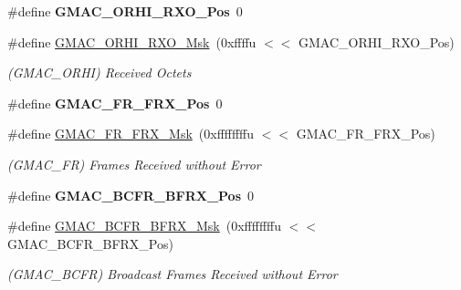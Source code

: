 \begin{DoxyCompactItemize}
\mbox{\label{group__SAME70__GMAC_gae9e8bcf4f97ba8f01c881b256d9f4924}} 
\#define {\bfseries G\+M\+A\+C\+\_\+\+O\+R\+H\+I\+\_\+\+R\+X\+O\+\_\+\+Pos}~0
\item 
\mbox{\label{group__SAME70__GMAC_gaf95253884b3483ac7db5ddb45e6a73f4}} 
\#define \mbox{\hyperlink{group__SAME70__GMAC_gaf95253884b3483ac7db5ddb45e6a73f4}{G\+M\+A\+C\+\_\+\+O\+R\+H\+I\+\_\+\+R\+X\+O\+\_\+\+Msk}}~(0xffffu $<$$<$ G\+M\+A\+C\+\_\+\+O\+R\+H\+I\+\_\+\+R\+X\+O\+\_\+\+Pos)
\begin{DoxyCompactList}\small\item\em (G\+M\+A\+C\+\_\+\+O\+R\+HI) Received Octets \end{DoxyCompactList}\item 
\mbox{\label{group__SAME70__GMAC_gab59eb0b2a4ca2b0089d0039b58b0745a}} 
\#define {\bfseries G\+M\+A\+C\+\_\+\+F\+R\+\_\+\+F\+R\+X\+\_\+\+Pos}~0
\item 
\mbox{\label{group__SAME70__GMAC_gaa5e2bd4754982997653c19876af89ca2}} 
\#define \mbox{\hyperlink{group__SAME70__GMAC_gaa5e2bd4754982997653c19876af89ca2}{G\+M\+A\+C\+\_\+\+F\+R\+\_\+\+F\+R\+X\+\_\+\+Msk}}~(0xffffffffu $<$$<$ G\+M\+A\+C\+\_\+\+F\+R\+\_\+\+F\+R\+X\+\_\+\+Pos)
\begin{DoxyCompactList}\small\item\em (G\+M\+A\+C\+\_\+\+FR) Frames Received without Error \end{DoxyCompactList}\item 
\mbox{\label{group__SAME70__GMAC_gaf7a9143b9ab4a7adce04bfef76d5b0a3}} 
\#define {\bfseries G\+M\+A\+C\+\_\+\+B\+C\+F\+R\+\_\+\+B\+F\+R\+X\+\_\+\+Pos}~0
\item 
\mbox{\label{group__SAME70__GMAC_ga4083e692955643f85fddc9c0a7451b26}} 
\#define \mbox{\hyperlink{group__SAME70__GMAC_ga4083e692955643f85fddc9c0a7451b26}{G\+M\+A\+C\+\_\+\+B\+C\+F\+R\+\_\+\+B\+F\+R\+X\+\_\+\+Msk}}~(0xffffffffu $<$$<$ G\+M\+A\+C\+\_\+\+B\+C\+F\+R\+\_\+\+B\+F\+R\+X\+\_\+\+Pos)
\begin{DoxyCompactList}\small\item\em (G\+M\+A\+C\+\_\+\+B\+C\+FR) Broadcast Frames Received without Error \end{DoxyCompactList}\item 
$$
\end{DoxyCompactItemize}
